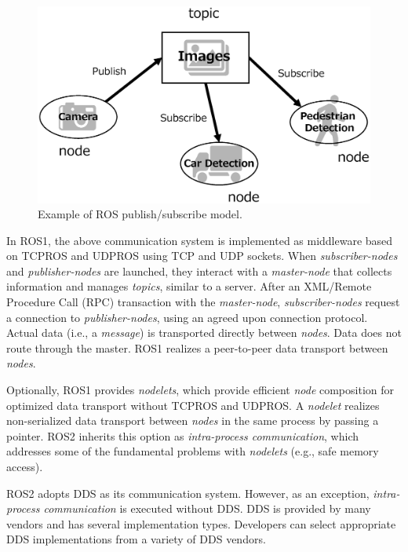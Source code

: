 \documentclass{sig-alternate-05-2015}
\begin{document}
\begin{figure}[t]
  \centering
  \includegraphics[width=0.8\linewidth]{../figure/ros_pubsub_fig.eps}
  \vspace{-5mm}
  \caption{\label{fig:orgparagraph2}
    Example of ROS publish/subscribe model.}
  \vspace{-6mm}
\end{figure}

In ROS1, the above communication system is implemented as middleware based on TCPROS and UDPROS using TCP and UDP sockets. 
When \emph{subscriber-nodes} and \emph{publisher-nodes} are launched, they interact with a \emph{master-node} that collects information and manages \emph{topics}, similar to a server. 
After an XML/Remote Procedure Call (RPC) transaction with the \emph{master-node}, \emph{subscriber-nodes} request a connection to \emph{publisher-nodes}, using an agreed upon connection protocol. 
Actual data (i.e., a \emph{message}) is transported directly between \emph{nodes}. 
Data does not route through the master. 
ROS1 realizes a peer-to-peer data transport between \emph{nodes}. 

Optionally, ROS1 provides \emph{nodelets}, which provide efficient \emph{node} composition for optimized data transport without TCPROS and UDPROS. 
A \emph{nodelet} realizes non-serialized data transport between \emph{nodes} in the same process by passing a pointer. 
ROS2 inherits this option as \emph{intra-process communication}, which addresses some of the fundamental problems with \emph{nodelets} (e.g., safe memory access).

ROS2 adopts DDS as its communication system. However, as an exception, \emph{intra-process communication} is executed without DDS.
DDS is provided by many vendors and has several implementation types.
Developers can select appropriate DDS implementations from a variety of DDS vendors.

\vspace{-1mm}
\end{document}
